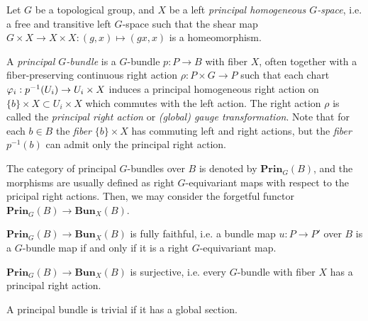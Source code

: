 \documentclass{../../large}
\begin{document}
\begin{prb}
Let $G$ be a topological group, and $X$ be a left \emph{principal homogeneous $G$-space}, i.e. a free and transitive left $G$-space such that the shear map $G\times X\to X\times X:(g,x)\mapsto(gx,x)$ is a homeomorphism.

A \emph{principal $G$-bundle} is a $G$-bundle $p:P\to B$ with fiber $X$, often together with a fiber-preserving continuous right action $\rho:P\times G\to P$ such that each chart $\varphi_i:p^{-1}(U_i)\to U_i\times X$ induces a principal homogeneous right action on $\{b\}\times X\subset U_i\times X$ which commutes with the left action.
The right action $\rho$ is called the \emph{principal right action} or \emph{(global) gauge transformation}.
Note that for each $b\in B$ the \emph{fiber} $\{b\}\times X$ has commuting left and right actions, but the \emph{fiber} $p^{-1}(b)$ can admit only the principal right action.

The category of principal $G$-bundles over $B$ is denoted by $\mathbf{Prin}_G(B)$, and the morphisms are usually defined as right $G$-equivariant maps with respect to the pricipal right actions.
Then, we may consider the forgetful functor $\mathbf{Prin}_G(B)\to\mathbf{Bun}_X(B)$.
\begin{parts}
\item $\mathbf{Prin}_G(B)\to\mathbf{Bun}_X(B)$ is fully faithful, i.e. a bundle map $u:P\to P'$ over $B$ is a $G$-bundle map if and only if it is a right $G$-equivariant map. 
\item $\mathbf{Prin}_G(B)\to\mathbf{Bun}_X(B)$ is surjective, i.e. every $G$-bundle with fiber $X$ has a principal right action.
\item A principal bundle is trivial if it has a global section.
\end{parts}
\end{prb}
\end{document}
